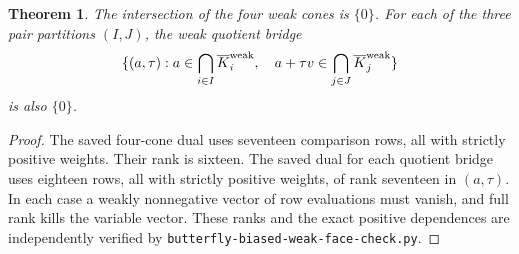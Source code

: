 \documentclass[11pt]{article}
\newtheorem{theorem}{Theorem}
\begin{document}
\begin{theorem}
The intersection of the four weak cones is $\{0\}$. For each of the
three pair partitions $(I,J)$, the weak quotient bridge
\[
 \{(a,\tau):a\in\bigcap_{i\in I}\overline K_i^{\rm weak},\quad
       a+\tau v\in\bigcap_{j\in J}\overline K_j^{\rm weak}\}
\]
is also $\{0\}$.
\end{theorem}
\begin{proof}
The saved four-cone dual uses seventeen comparison rows, all with
strictly positive weights. Their rank is sixteen. The saved dual for
each quotient bridge uses eighteen rows, all with strictly positive
weights, of rank seventeen in $(a,\tau)$. In each case a weakly
nonnegative vector of row evaluations must vanish, and full rank kills
the variable vector. These ranks and the exact positive dependences
are independently verified by
\texttt{butterfly-biased-weak-face-check.py}.
\end{proof}
\end{document}
